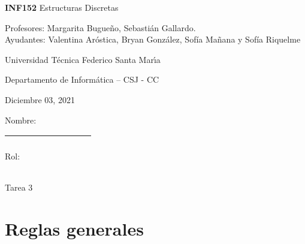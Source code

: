 \documentclass[letterpaper,10pt]{article}
\begin{document}
\thispagestyle{empty}
 	
\begin{minipage}[t]{0.6\textwidth}

{\LARGE \textbf{INF152} Estructuras Discretas}

{\large Profesores: Margarita Bugueño, Sebastián Gallardo.}\\
{\large Ayudantes: Valentina Aróstica, Bryan González, Sofía Mañana y Sofía Riquelme}

Universidad T\'ecnica Federico Santa Mar\'{\i}a

Departamento de Inform\'atica -- CSJ - CC 

Diciembre 03, 2021

\end{minipage}
\hfill
\begin{minipage}[t]{0.3\textwidth}
Nombre:

\begin{tabular}{|c|}\hline
$~~~~~~~~~~~~~~~~~~~~~~~~~~~~~~~~~~~~$\\\hline
\end{tabular}

\vspace{0.1cm}

Rol:

\begin{tabular}{|c|c|c|c|c|c|c|c|c|c|c|}\hline
& & & & & & & & & &\\\hline
\end{tabular}
\end{minipage}

\vspace{0.3cm}

\begin{center}
    \huge Tarea 3
\end{center}


\section{Reglas generales}

\end{document}
